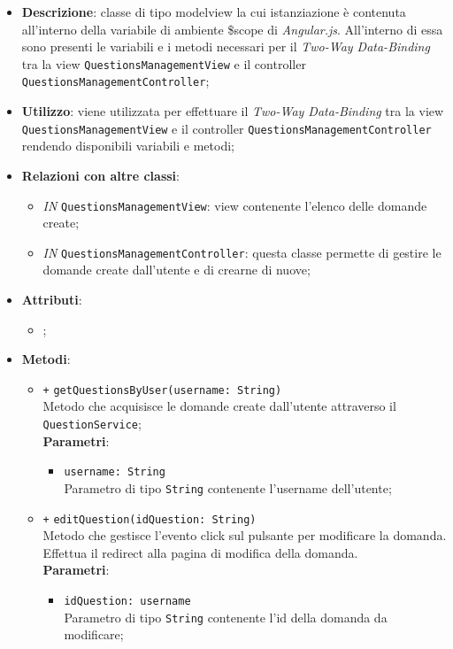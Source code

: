 \begin{itemize}
	\item \textbf{Descrizione}: classe di tipo modelview la cui istanziazione è contenuta all'interno della variabile di ambiente \$scope di \textit{Angular.js}. All'interno di essa sono presenti le variabili e i metodi necessari per il \textit{Two-Way Data-Binding} tra la view \texttt{QuestionsManagementView} e il controller \texttt{QuestionsManagementController};
	\item \textbf{Utilizzo}: viene utilizzata per effettuare il \textit{Two-Way Data-Binding} tra la view \texttt{QuestionsManagementView} e il controller \texttt{QuestionsManagementController} rendendo disponibili variabili e metodi;
	\item \textbf{Relazioni con altre classi}: 
	\begin{itemize}
		\item \textit{IN} \texttt{QuestionsManagementView}: view contenente l’elenco delle domande create; 
		\item \textit{IN} \texttt{QuestionsManagementController}: questa classe permette di gestire le domande create dall’utente e di crearne di nuove;
	\end{itemize}
	\item \textbf{Attributi}: 
	\begin{itemize}
		\item ;
	\end{itemize}
	\item \textbf{Metodi}: 
	\begin{itemize}
			\item \texttt{+} \texttt{getQuestionsByUser(username: String)} \\ 
			Metodo che acquisisce le domande create dall'utente attraverso il \texttt{QuestionService};\\
			\textbf{Parametri}:
			\begin{itemize}
				\item \texttt{username: String} \\
				Parametro di tipo \texttt{String} contenente l'username dell'utente;
			\end{itemize}
			\item \texttt{+} \texttt{editQuestion(idQuestion: String)} \\ 
			Metodo che gestisce l’evento click sul pulsante per modificare la domanda. Effettua il redirect alla pagina di modifica della domanda. \\
			\textbf{Parametri}:
			\begin{itemize}
				\item \texttt{idQuestion: username} \\
				Parametro di tipo \texttt{String} contenente l'id della domanda da modificare;
			\end{itemize}
	\end{itemize}
\end{itemize}	

